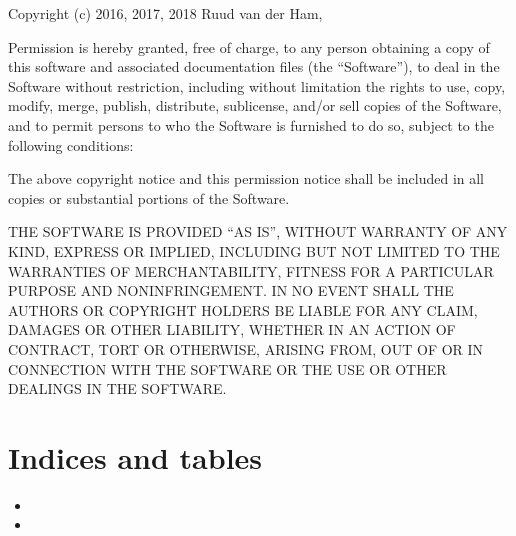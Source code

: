 \documentclass[letterpaper,10pt,english]{sphinxmanual}
\begin{document}
Copyright (c) 2016, 2017, 2018 Ruud van der Ham, 

Permission is hereby granted, free of charge, to any person obtaining a copy of
this software and associated documentation files (the “Software”), to deal in
the Software without restriction, including without limitation the rights to
use, copy, modify, merge, publish, distribute, sublicense, and/or sell copies
of the Software, and to permit persons to who the Software is furnished to do
so, subject to the following conditions:

The above copyright notice and this permission notice shall be included in all
copies or substantial portions of the Software.

THE SOFTWARE IS PROVIDED “AS IS”, WITHOUT WARRANTY OF ANY KIND, EXPRESS OR
IMPLIED, INCLUDING BUT NOT LIMITED TO THE WARRANTIES OF MERCHANTABILITY,
FITNESS FOR A PARTICULAR PURPOSE AND NONINFRINGEMENT. IN NO EVENT SHALL THE
AUTHORS OR COPYRIGHT HOLDERS BE LIABLE FOR ANY CLAIM, DAMAGES OR OTHER
LIABILITY, WHETHER IN AN ACTION OF CONTRACT, TORT OR OTHERWISE, ARISING FROM,
OUT OF OR IN CONNECTION WITH THE SOFTWARE OR THE USE OR OTHER DEALINGS IN THE
SOFTWARE.


\chapter{Indices and tables}
\label{\detokenize{Indices:indices-and-tables}}\label{\detokenize{Indices::doc}}\begin{itemize}
\item {} 

\item {} 

\end{itemize}



\renewcommand{\indexname}{Index}
\printindex
\end{document}
